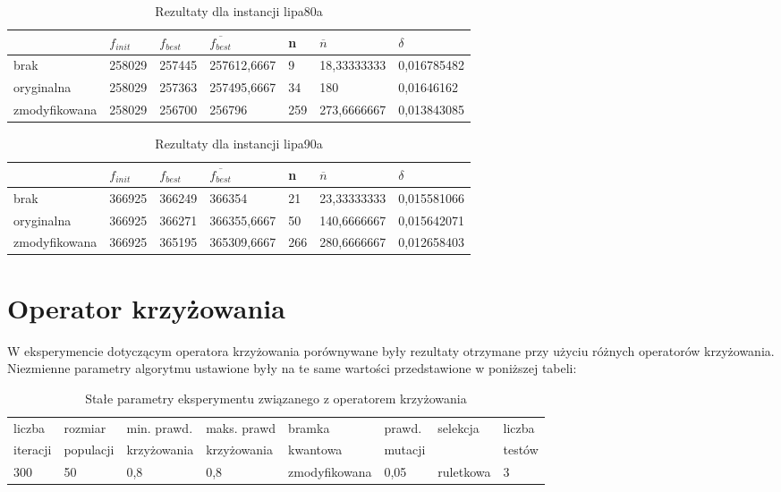 \begin{table}[H]
\label{T1_lipa80a}
\begin{tabular}{l l l l l l l}
\hline
 & $f_{init}$ & $f_{best}$ & $\overline{f_{best}}$ & n & $\overline{n}$ & $\delta$ \\
\hline
brak & 258029 & 257445 & 257612,6667 & 9 & 18,33333333 & 0,016785482\\
oryginalna & 258029 & 257363 & 257495,6667 & 34 & 180 & 0,01646162\\
zmodyfikowana & 258029 & 256700 & 256796 & 259 & 273,6666667 & 0,013843085\\
\hline
\end{tabular}
\caption{Rezultaty dla instancji lipa80a}
\end{table}

\begin{table}[H]
\label{T1_lipa90a}
\begin{tabular}{l l l l l l l}
\hline
 & $f_{init}$ & $f_{best}$ & $\overline{f_{best}}$ & n & $\overline{n}$ & $\delta$ \\
\hline
brak & 366925 & 366249 & 366354 & 21 & 23,33333333 & 0,015581066\\
oryginalna & 366925 & 366271 & 366355,6667 & 50 & 140,6666667 & 0,015642071\\
zmodyfikowana & 366925 & 365195 & 365309,6667 & 266 & 280,6666667 & 0,012658403\\
\hline
\end{tabular}
\caption{Rezultaty dla instancji lipa90a}
\end{table}

\section{Operator krzyżowania}
W eksperymencie dotyczącym operatora krzyżowania porównywane były rezultaty otrzymane przy użyciu różnych operatorów krzyżowania. Niezmienne parametry algorytmu ustawione były na te same wartości przedstawione w poniższej tabeli:

\begin{table}[H]
\label{T2_params}
\begin{tabular}{l l l l l l l l}
\hline
liczba & rozmiar & min. prawd. & maks. prawd & bramka & prawd. & selekcja & liczba \\
iteracji & populacji & krzyżowania & krzyżowania & kwantowa & mutacji & & testów \\
\hline
300 & 50 & 0,8 & 0,8 & zmodyfikowana & 0,05 & ruletkowa & 3 \\
\hline
\end{tabular}
\caption{Stałe parametry eksperymentu związanego z operatorem krzyżowania}
\end{table}


